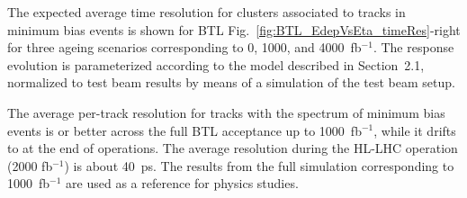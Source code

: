 The expected average time resolution for clusters associated to
tracks in minimum bias events is shown for BTL Fig.~\ref{fig:BTL_EdepVsEta_timeRes}-right 
for three ageing scenarios corresponding to 0, 1000, and
4000~fb$^{-1}$. The response evolution is parameterized according
to the model described in Section~2.1, normalized to test beam 
results by means of a \GEANT simulation of the test beam setup. 

%
%
The average per-track resolution for tracks with the \pt spectrum of 
minimum bias events is \tres or better across the full BTL acceptance up to 
1000~fb$^{-1}$, while it drifts to \trend at the end of  operations.  
The average resolution during the HL-LHC operation (2000 fb$^{-1}$) is 
about 40~ps. The results from the full simulation corresponding to
1000~fb$^{-1}$ are used as a reference for physics studies. 




